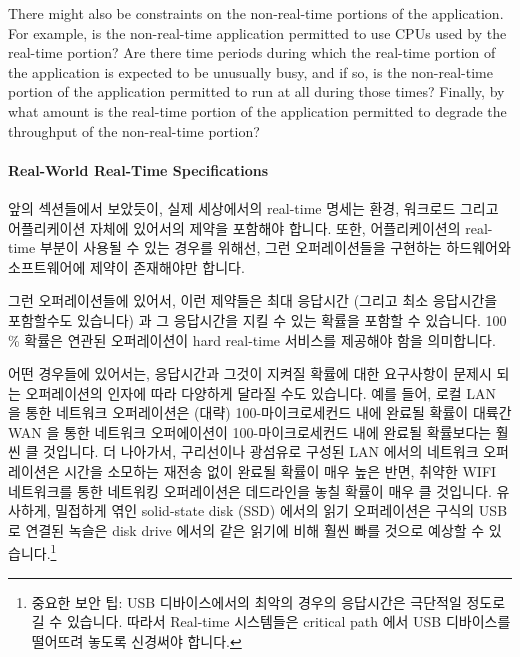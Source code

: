 There might also be constraints on the non-real-time portions of the
application.
For example, is the non-real-time application permitted to use CPUs used
by the real-time portion?
Are there time periods during which the real-time portion of the application
is expected to be unusually busy, and if so, is the non-real-time portion
of the application permitted to run at all during those times?
Finally, by what amount is the real-time portion of the application permitted
to degrade the throughput of the non-real-time portion?
\fi

\paragraph{Real-World Real-Time Specifications}
\label{sec:advsync:Real-World Real-Time Specifications}

앞의 섹션들에서 보았듯이, 실제 세상에서의 real-time 명세는 환경, 워크로드
그리고 어플리케이션 자체에 있어서의 제약을 포함해야 합니다.
또한, 어플리케이션의 real-time 부분이 사용될 수 있는 경우를 위해선, 그런
오퍼레이션들을 구현하는 하드웨어와 소프트웨어에 제약이 존재해야만 합니다.

그런 오퍼레이션들에 있어서, 이런 제약들은 최대 응답시간 (그리고 최소 응답시간을
포함할수도 있습니다) 과 그 응답시간을 지킬 수 있는 확률을 포함할 수 있습니다.
100\,\% 확률은 연관된 오퍼레이션이 hard real-time 서비스를 제공해야 함을
의미합니다.

어떤 경우들에 있어서는, 응답시간과 그것이 지켜질 확률에 대한 요구사항이 문제시
되는 오퍼레이션의 인자에 따라 다양하게 달라질 수도 있습니다.
예를 들어, 로컬 LAN 을 통한 네트워크 오퍼레이션은 (대략) 100-마이크로세컨드
내에 완료될 확률이 대륙간 WAN 을 통한 네트워크 오퍼에이션이 100-마이크로세컨드
내에 완료될 확률보다는 훨씬 클 것입니다.
더 나아가서, 구리선이나 광섬유로 구성된 LAN 에서의 네트워크 오퍼레이션은 시간을
소모하는 재전송 없이 완료될 확률이 매우 높은 반면, 취약한 WIFI 네트워크를 통한
네트워킹 오퍼레이션은 데드라인을 놓칠 확률이 매우 클 것입니다.
유사하게, 밀접하게 엮인 solid-state disk (SSD) 에서의 읽기 오퍼레이션은 구식의
USB 로 연결된 녹슬은 disk drive 에서의 같은 읽기에 비해 훨씬 빠를 것으로 예상할
수 있습니다.\footnote{
	중요한 보안 팁: USB 디바이스에서의 최악의 경우의 응답시간은 극단적일
	정도로 길 수 있습니다.
	따라서 Real-time 시스템들은 critical path 에서 USB 디바이스를 떨어뜨려
	놓도록 신경써야 합니다.}
\iffalse

